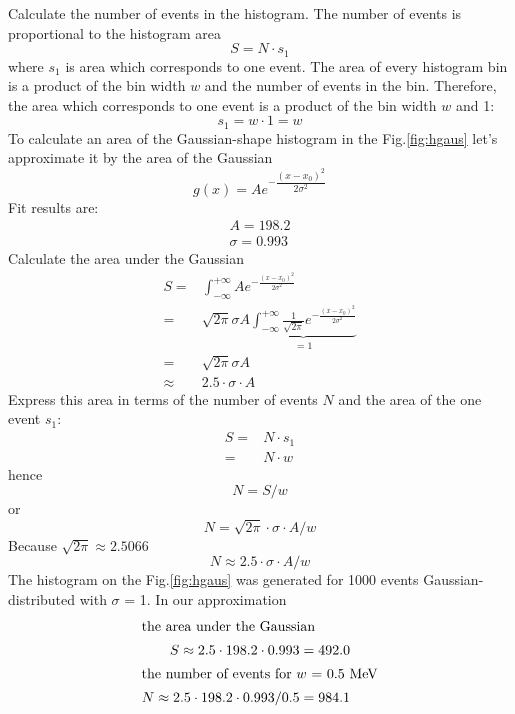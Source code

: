 \documentclass[english]{article}
\begin{document}
Calculate the number of events in the histogram. 
The number of events is proportional to the histogram area
$$
S = N \cdot s_1
$$
where $s_1$ is area which corresponds to one event. 
The area of every histogram bin is a product of the bin width $w$ and the number of events in the bin.
Therefore, the area which corresponds to one event is a product of the bin width $w$ and 1: 
$$
s_1 = w \cdot 1 = w
$$
To calculate an area of the Gaussian-shape histogram in the Fig.\ref{fig:hgaus} let's approximate it by the area of the Gaussian
$$
g(x) = Ae^{-\dfrac{(x-x_0)^2}{2\sigma^2}}
$$
Fit results are:
%
\begin{align*}
A = 198.2 \\
\sigma = 0.993
\end{align*}
%
Calculate the area under the Gaussian
%
\begin{align*}
S = & \int_{-\infty}^{+\infty} A e^{-\frac{(x-x_0)^2}{2\sigma^2}} \\
= & \sqrt{2\pi} \sigma A \underbrace{\int_{-\infty}^{+\infty} \frac{1}{\sqrt{2\pi}} e^{-\frac{(x-x_0)^2}{2\sigma^2}}}_{= 1} \\
= & \sqrt{2\pi} \sigma A \\
\approx & 2.5 \cdot \sigma \cdot A
\end{align*}
%
Express this area in terms of the number of events $N$ and the area of the one event $s_1$:
\begin{align*}
S = & N \cdot s_1 \\
= & N \cdot w
\end{align*}
hence
$$
N = S / w 
$$
or
$$
N = \sqrt{2\pi} \cdot \sigma \cdot A / w
$$
Because $\sqrt{2\pi} \approx 2.5066$
$$
N \approx 2.5 \cdot \sigma \cdot A / w
$$
The histogram on the Fig.\ref{fig:hgaus} was generated for 1000 events Gaussian-distributed with $\sigma$ = 1. 
In our approximation
\begin{align*}
\intertext{the area under the Gaussian}
S \approx 2.5 \cdot 198.2 \cdot 0.993 = 492.0 \\
\intertext{the number of events for $w$ = 0.5~MeV}
N \approx 2.5 \cdot 198.2 \cdot 0.993 / 0.5  = 984.1 \\
\end{align*}
\end{document}
